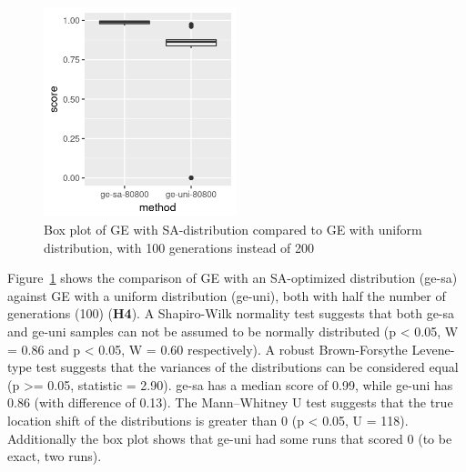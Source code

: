 \begin{figure}
    \centering
    \includegraphics[width=0.5\textwidth]{figures/gesa-geuni-80800}
    \caption[SA-optimized GE compared to uniform GE]{Box plot of \gls{GE} with \gls{SA}-distribution compared to \gls{GE} with uniform distribution, with 100 generations instead of 200}
    \label{fig:h4}
\end{figure}

Figure~\ref{fig:h4} shows the comparison of \gls{GE} with an \gls{SA}-optimized distribution (ge-sa) against \gls{GE} with a uniform distribution (ge-uni), both with half the number of generations (100) (\textbf{H4}).
A Shapiro-Wilk normality test suggests that both ge-sa and ge-uni samples can not be assumed to be normally distributed (p < 0.05, W = 0.86 and p < 0.05, W = 0.60 respectively).
A robust Brown-Forsythe Levene-type test suggests that the variances of the distributions can be considered equal (p >= 0.05, statistic = 2.90).
ge-sa has a median score of 0.99, while ge-uni has 0.86 (with difference of 0.13).
The Mann–Whitney U test suggests that the true location shift of the distributions is greater than 0 (p < 0.05, U = 118).
Additionally the box plot shows that ge-uni had some runs that scored 0 (to be exact, two runs).

